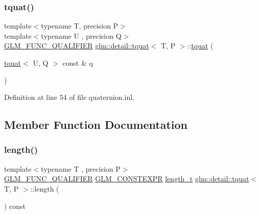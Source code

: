\subsubsection{\texorpdfstring{tquat()}{tquat()}\hspace{0.1cm}{\footnotesize\ttfamily [9/9]}}
{\footnotesize\ttfamily template$<$typename T, precision P$>$ \\
template$<$typename U , precision Q$>$ \\
\hyperlink{setup_8hpp_a33fdea6f91c5f834105f7415e2a64407}{G\+L\+M\+\_\+\+F\+U\+N\+C\+\_\+\+Q\+U\+A\+L\+I\+F\+I\+ER} \hyperlink{structglm_1_1detail_1_1tquat}{glm\+::detail\+::tquat}$<$ T, P $>$\+::\hyperlink{structglm_1_1detail_1_1tquat}{tquat} (\begin{DoxyParamCaption}\item[{\hyperlink{structglm_1_1detail_1_1tquat}{tquat}$<$ U, Q $>$ const \&}]{q }\end{DoxyParamCaption})}



Definition at line 54 of file quaternion.\+inl.



\subsection{Member Function Documentation}
\mbox{\label{structglm_1_1detail_1_1tquat_a7908057d4c01c84ee62b55b1f188f822}} 
\subsubsection{\texorpdfstring{length()}{length()}}
{\footnotesize\ttfamily template$<$typename T , precision P$>$ \\
\hyperlink{setup_8hpp_a33fdea6f91c5f834105f7415e2a64407}{G\+L\+M\+\_\+\+F\+U\+N\+C\+\_\+\+Q\+U\+A\+L\+I\+F\+I\+ER} \hyperlink{setup_8hpp_a08b807947b47031d3a511f03f89645ad}{G\+L\+M\+\_\+\+C\+O\+N\+S\+T\+E\+X\+PR} \hyperlink{namespaceglm_a090a0de2260835bee80e71a702492ed9}{length\+\_\+t} \hyperlink{structglm_1_1detail_1_1tquat}{glm\+::detail\+::tquat}$<$ T, P $>$\+::length (\begin{DoxyParamCaption}{ }\end{DoxyParamCaption}) const}



